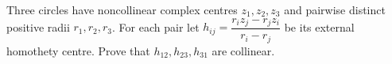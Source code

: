 Three circles have noncollinear complex centres $z_1,z_2,z_3$ and pairwise distinct positive radii $r_1,r_2,r_3$. For each pair let $h_{ij}=\dfrac{r_i z_j-r_j z_i}{r_i-r_j}$ be its external homothety centre. Prove that $h_{12},h_{23},h_{31}$ are collinear.
